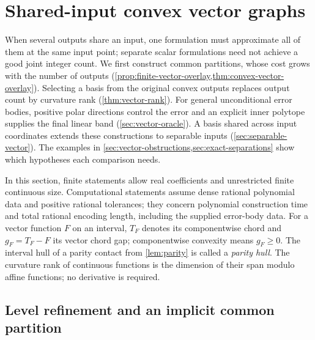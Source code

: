 \section{Shared-input convex vector graphs}\label{sec:vector}

When several outputs share an input, one formulation must approximate
all of them at the same input point; separate scalar formulations need
not achieve a good joint integer count. We first construct common
partitions, whose cost grows with the number of outputs
(\cref{prop:finite-vector-overlay,thm:convex-vector-overlay}). Selecting
a basis from the original convex outputs replaces output count by
curvature rank (\cref{thm:vector-rank}). For general unconditional error
bodies, positive polar directions control the error and an explicit inner
polytope supplies the final linear band (\cref{sec:vector-oracle}).
A basis shared across input coordinates extends these constructions to
separable inputs (\cref{sec:separable-vector}). The examples in
\cref{sec:vector-obstructions,sec:exact-separations} show which
hypotheses each comparison needs.

In this section, finite statements allow real coefficients and
unrestricted finite continuous size. Computational statements assume
dense rational polynomial data and positive rational tolerances; they
concern polynomial construction time and total rational encoding length,
including the supplied error-body data. For a vector function $F$ on an
interval, $T_F$ denotes its componentwise chord and $g_F=T_F-F$ its
vector chord gap; componentwise convexity means $g_F\ge0$. The interval
hull of a parity contact from \cref{lem:parity} is called a
\emph{parity hull}. The curvature rank of continuous functions is the
dimension of their span modulo affine functions; no derivative is
required.

\subsection{Level refinement and an implicit common partition}

